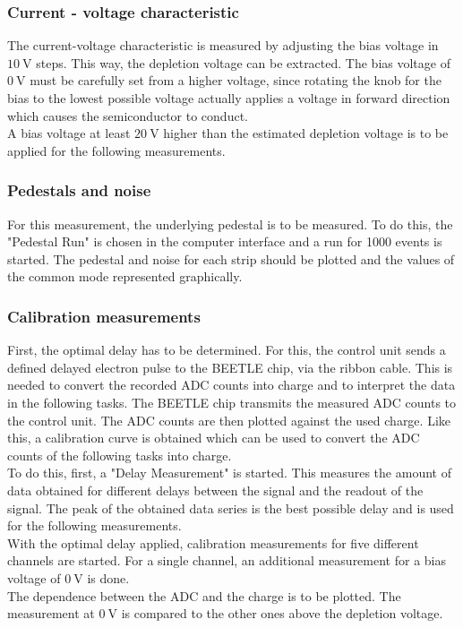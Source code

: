 \subsubsection{Current - voltage characteristic}
\label{measure:1}
The current-voltage characteristic is measured by adjusting the bias voltage in $\qty{10}{\volt}$ steps. This way,
the depletion voltage can be extracted. The bias voltage of $\qty{0}{\volt}$ must be carefully set from a higher voltage,
since rotating the knob for the bias to the lowest possible voltage actually applies a voltage in forward direction which causes
the semiconductor to conduct.\\
A bias voltage at least $\qty{20}{\volt}$ higher than the estimated depletion voltage is to be applied for the following measurements.

\subsubsection{Pedestals and noise}
\label{measure:2}
For this measurement, the underlying pedestal is to be measured. To do this, the "Pedestal Run" is chosen in the computer
interface and a run for 1000 events is started. The pedestal and noise for each strip should be plotted and the values of the
common mode represented graphically.

\subsubsection{Calibration measurements}
\label{measure:3}
First, the optimal delay has to be determined. For this, the control unit sends a defined delayed electron pulse to the BEETLE chip,
via the ribbon cable. This is needed to convert the recorded ADC counts into charge and to interpret the data in the following
tasks. The BEETLE chip transmits the measured ADC counts to the control unit. The ADC counts are then plotted against
the used charge. Like this, a calibration curve is obtained which can be used to convert the ADC counts of the following
tasks into charge.\\
To do this, first, a "Delay Measurement" is started. This measures the amount of data obtained for different delays between
the signal and the readout of the signal. The peak of the obtained data series is the best possible delay and is used 
for the following measurements.\\
With the optimal delay applied, calibration measurements for five different channels are started. For a single channel, an additional
measurement for a bias voltage of $\qty{0}{\volt}$ is done.\\
The dependence between the ADC and the charge is to be plotted. The measurement at $\qty{0}{\volt}$ is compared to the other ones above 
the depletion voltage.

